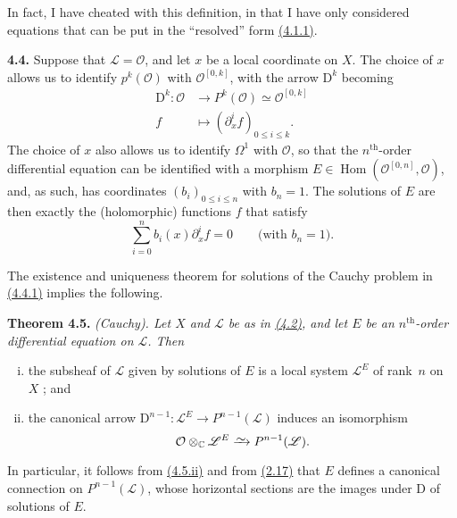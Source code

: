 \documentclass{report}
\newenvironment{itenv}[1]
  {\phantomsection\par\medskip\noindent\textbf{#1.}\itshape}
  {\medskip}
\newenvironment{rmenv}[1]
  {\phantomsection\par\medskip\noindent\textbf{#1.}\rmfamily}
  {\medskip}
\newcommand{\scr}[1]{{\mathscr{#1}}}
\renewcommand{\cal}[1]{{\mathcal{#1}}}
\newcommand{\CC}{\mathbb{C}}
\newcommand{\DD}{\mathrm{D}}
\newcommand{\simto}{\xrightarrow{\raisebox{-0.7ex}[0ex][0ex]{$\sim$}}}
\renewcommand{\leq}{\leqslant}
\DeclareMathOperator{\Hom}{Hom}
\newcommand{\oldpage}[1]{\marginpar{\footnotesize$\Big\vert$ \textit{p.~#1}}}
\begin{document}
In fact, I have cheated with this definition, in that I have only considered equations that can be put in the ``resolved'' form \hyperref[I.4.1.1]{(4.1.1)}.

\oldpage{25}
\begin{rmenv}{4.4}
\label{I.4.4}
  Suppose that $\scr{L}=\cal{O}$, and let $x$ be a local coordinate on $X$.
  The choice of $x$ allows us to identify $p^k(\cal{O})$ with $\cal{O}^{[0,k]}$, with the arrow $\DD^k$ becoming
  \[
    \begin{aligned}
      \DD^k\colon \cal{O} &\to P^k(\cal{O}) \simeq \cal{O}^{[0,k]}
    \\f &\mapsto (\partial_x^i f)_{0\leq i\leq k}.
    \end{aligned}
  \]
  The choice of $x$ also allows us to identify $\Omega^1$ with $\cal{O}$, so that the $n^\mathrm{th}$-order differential equation can be identified with a morphism $E\in\Hom(\cal{O}^{[0,n]},\cal{O})$, and, as such, has coordinates $(b_i)_{0\leq i\leq n}$ with $b_n=1$.
  The solutions of $E$ are then exactly the (holomorphic) functions $f$ that satisfy
  \[
  \label{I.4.4.1}
    \sum_{i=0}^n b_i(x) \partial_x^i f = 0
    \qquad\mbox{(with $b_n=1$).}
  \tag{4.4.1}
  \]

  The existence and uniqueness theorem for solutions of the Cauchy problem in \hyperref[I.4.4.1]{(4.4.1)} implies the following.
\end{rmenv}

\begin{itenv}{Theorem 4.5}
\label{I.4.5}
  \emph{(Cauchy).}
  Let $X$ and $\scr{L}$ be as in \hyperref[I.4.2]{(4.2)}, and let $E$ be an $n^\mathrm{th}$-order differential equation on $\scr{L}$.
  Then
  \begin{enumerate}[(i)]
    \item the subsheaf of $\scr{L}$ given by solutions of $E$ is a local system $\scr{L}^E$ of rank~$n$ on $X$ ; and
    \item the canonical arrow $\DD^{n-1}\colon\scr{L}^E \to P^{n-1}(\scr{L})$ induces an isomorphism
      \[
        \cal{O}\otimes_\CC\scr{L}^E \simto P^{n-1}(\scr{L}).
      \]
  \end{enumerate}
\end{itenv}

In particular, it follows from \hyperref[I.4.5]{(4.5.ii)} and from \hyperref[I.2.17]{(2.17)} that $E$ defines a canonical connection on $P^{n-1}(\scr{L})$, whose horizontal sections are the images under $\DD$ of solutions of $E$.
\end{document}
